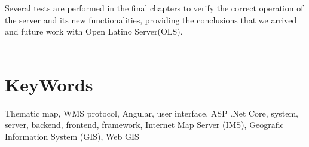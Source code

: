 Several tests are performed in the final chapters to verify the correct operation of the server and its new functionalities, providing the conclusions that we arrived and future work with Open Latino Server(OLS).\\\\

\section*{KeyWords}
Thematic map, WMS protocol, Angular, user interface, ASP .Net Core, system, server, backend, frontend, framework, Internet Map Server (IMS), Geografic Information System (GIS), Web GIS